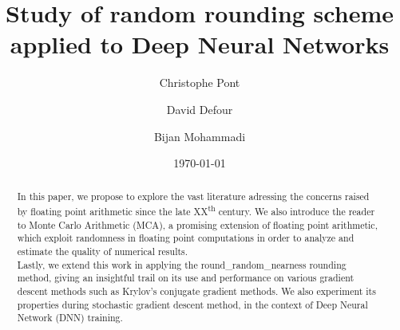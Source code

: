 \documentclass[a4paper,11pt]{article}
\let\cite=\supercite
\begin{document}
\title{%
Study of random rounding scheme applied to Deep Neural Networks}
\author[1]{Christophe Pont}
\author[1]{David Defour}
\author[2]{Bijan Mohammadi}
\date{\today{}} %
\setcounter{Maxaffil}{0}
\renewcommand\Affilfont{\itshape\small}

\maketitle{} %
\begin{abstract}
In this paper, we propose to explore the vast literature adressing the concerns raised by floating point arithmetic since the late XX\textsuperscript{th} century. We also introduce the reader to Monte Carlo Arithmetic (MCA)\cite{Parker1997}, a promising extension of floating point arithmetic, which exploit randomness in floating point computations in order to analyze and estimate the quality of numerical results.\\
Lastly, we extend this work in applying the {\ttfamily round\_random\_nearness} rounding method,
 giving an insightful trail on its use and performance on various gradient descent methods such as Krylov's conjugate gradient methods. 
We also experiment its properties during stochastic gradient descent method, in the context of Deep Neural Network (DNN) training.
\end{abstract}

\tableofcontents{} %
\end{document}
